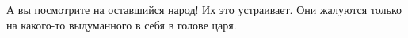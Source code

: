 \begin{itemize}
 
А вы посмотрите на оставшийся народ! Их это устраивает. Они жалуются только на
какого-то выдуманного в себя в голове царя.


\end{itemize}

